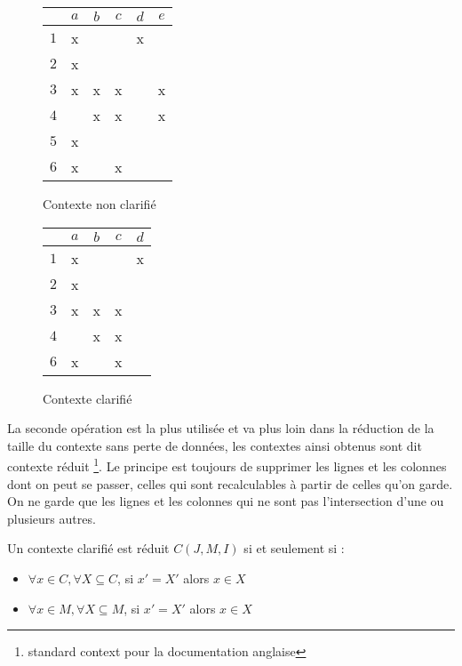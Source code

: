 \begin{figure}[H]
	\begin{minipage}[c]{0.5\textwidth}
	\begin{center}
		\begin{tabular}{ l | c c c c c }
			 & $a$ & $b$ & $c$ & $d$ & $e$ \\
			\hline
			$1$ & x & & & x & \\
			$2$ & x & & & & \\
			$3$ & x & x & x & & x \\
			$4$ & & x & x & & x \\
			$5$ & x & & & & \\
			$6$ & x & & x & & \\
		\end{tabular}
	\end{center}
	\caption{Contexte non clarifié}
	\label{def_contexte_non_clarifie}
	\end{minipage}
	\begin{minipage}[c]{0.5\textwidth}
	\begin{center}
		\begin{tabular}{ l | c c c c }
			 & $a$ & $b$ & $c$ & $d$ \\
			\hline
			$1$ & x & & & x \\
			$2$ & x & & & \\
			$3$ & x & x & x & \\
			$4$ & & x & x & \\
			$6$ & x & & x & \\
		\end{tabular}
	\end{center}
	\caption{Contexte clarifié}
	\label{def_contexte_clarifie}
	\end{minipage}
\end{figure}

La seconde opération est la plus utilisée et va plus loin dans la réduction de la taille du contexte sans perte de données, les contextes ainsi obtenus sont dit \guillemotleft{} contexte réduit \guillemotright \footnote{\guillemotleft{} standard context \guillemotright{} pour la documentation anglaise}. Le principe est toujours de supprimer les lignes et les colonnes dont on peut se passer, celles qui sont recalculables à partir de celles qu'on garde. On ne garde que les lignes et les colonnes qui ne sont pas l'intersection d'une ou plusieurs autres.

\begin{definition}
Un contexte clarifié est réduit $C(J, M, I)$ si et seulement si :
\begin{itemize}
	\item $\forall x \in C, \forall X \subseteq C$, si $x' = X'$ alors $x \in X$
	\item $\forall x \in M, \forall X \subseteq M$, si $x' = X'$ alors $x \in X$
\end{itemize}
\end{definition}

